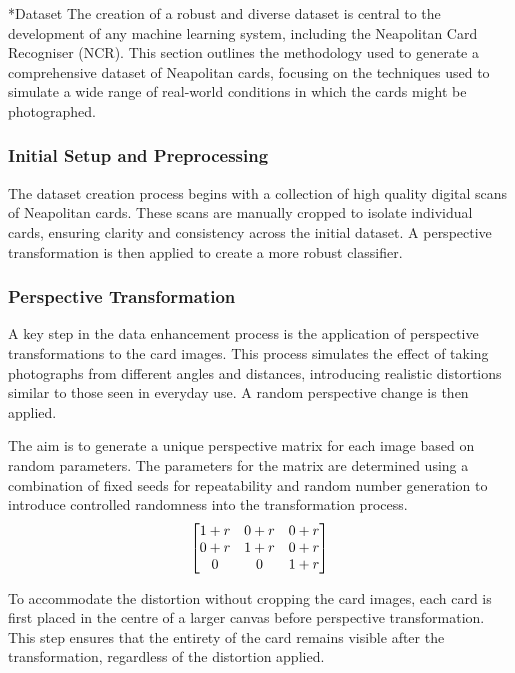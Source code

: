 \documentclass[twocolumn, a4paper,10pt]{article}
\makeatletter
\renewcommand\subsection{\@startsection{subsection}{1}{\z@}{\z@}{\z@}{\normalfont\normalsize\bfseries}}
\renewcommand\subsection{\@startsection{subsection}{1}{\z@}{\z@}{0.1pt}{\normalfont\normalsize\bfseries}}
\makeatother
\begin{document}
\subsection*{Dataset}
The creation of a robust and diverse dataset is central to the development of any machine learning system, including the Neapolitan Card Recogniser (NCR). This section outlines the methodology used to generate a comprehensive dataset of Neapolitan cards, focusing on the techniques used to simulate a wide range of real-world conditions in which the cards might be photographed.

\subsubsection{Initial Setup and Preprocessing}
The dataset creation process begins with a collection of high quality digital scans of Neapolitan cards. These scans are manually cropped to isolate individual cards, ensuring clarity and consistency across the initial dataset. A perspective transformation is then applied to create a more robust classifier. 

\subsubsection{Perspective Transformation}
A key step in the data enhancement process is the application of perspective transformations to the card images. This process simulates the effect of taking photographs from different angles and distances, introducing realistic distortions similar to those seen in everyday use. A random perspective change is then applied.

The aim is to generate a unique perspective matrix for each image based on random parameters. The parameters for the matrix are determined using a combination of fixed seeds for repeatability and random number generation to introduce controlled randomness into the transformation process.
\begin{equation}
  \centering
  \begin{bmatrix}
    1+r & 0+r & 0+r\\
    0+r & 1+r & 0+r\\
    0 & 0 & 1+r
  \end{bmatrix}
\end{equation}

To accommodate the distortion without cropping the card images, each card is first placed in the centre of a larger canvas before perspective transformation. This step ensures that the entirety of the card remains visible after the transformation, regardless of the distortion applied.
\end{document}
